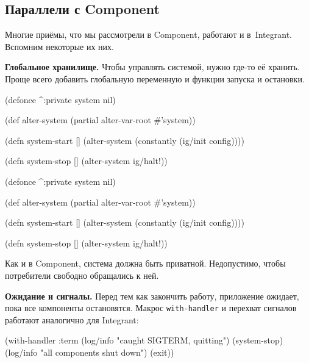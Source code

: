 \subsection{Параллели с Component}

Многие приёмы, что мы рассмотрели в Component, работают и в~Integrant. Вспомним
некоторые их них.


\textbf{Глобальное хранилище.} Чтобы управлять системой, нужно где-то её
хранить. Проще всего добавить глобальную переменную и функции запуска и
остановки.

\ifx\DEVICETYPE\MOBILE

\begin{english}
  \begin{clojure}
(defonce ^:private system nil)

(def alter-system
  (partial alter-var-root #'system))

(defn system-start []
  (alter-system
    (constantly (ig/init config))))

(defn system-stop []
  (alter-system ig/halt!))
  \end{clojure}
\end{english}

\else

\begin{english}
  \begin{clojure}
(defonce ^:private system nil)

(def alter-system (partial alter-var-root #'system))

(defn system-start []
  (alter-system (constantly (ig/init config))))

(defn system-stop []
  (alter-system ig/halt!))
  \end{clojure}
\end{english}

\fi

Как и в Component, система должна быть приватной. Недопустимо, чтобы потребители
свободно обращались к ней.


\textbf{Ожидание и сигналы.} Перед тем как закончить работу, приложение ожидает,
пока все компоненты остановятся. Макрос \verb|with-handler| и перехват
сигналов работают аналогично для Integrant:

\begin{english}
  \begin{clojure}
(with-handler :term
  (log/info "caught SIGTERM, quitting")
  (system-stop)
  (log/info "all components shut down")
  (exit))
  \end{clojure}
\end{english}

